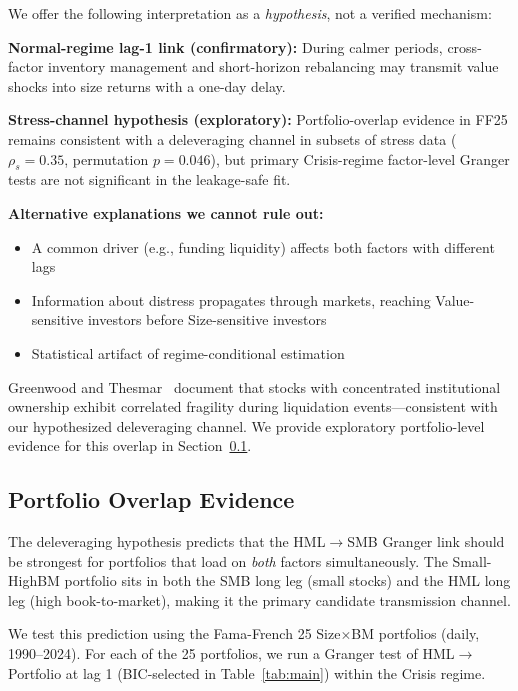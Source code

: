 \documentclass{uai2026}
\begin{document}
We offer the following interpretation as a \emph{hypothesis}, not a verified mechanism:

\textbf{Normal-regime lag-1 link (confirmatory):} During calmer periods,
cross-factor inventory management and short-horizon rebalancing may transmit
value shocks into size returns with a one-day delay.

\textbf{Stress-channel hypothesis (exploratory):} Portfolio-overlap evidence in
FF25 remains consistent with a deleveraging channel in subsets of stress data
($\rho_s = 0.35$, permutation $p = 0.046$), but primary Crisis-regime
factor-level Granger tests are not significant in the leakage-safe fit.

\textbf{Alternative explanations we cannot rule out:}
\begin{itemize}
    \item A common driver (e.g., funding liquidity) affects both factors with different lags
    \item Information about distress propagates through markets, reaching Value-sensitive
    investors before Size-sensitive investors
    \item Statistical artifact of regime-conditional estimation
\end{itemize}

Greenwood and Thesmar~\cite{greenwood2011stock} document that stocks with
concentrated institutional ownership exhibit correlated fragility during
liquidation events---consistent with our hypothesized deleveraging channel.
We provide exploratory portfolio-level evidence for this overlap in
Section~\ref{sec:overlap_evidence}.

\subsection{Portfolio Overlap Evidence}
\label{sec:overlap_evidence}

The deleveraging hypothesis predicts that the HML$\to$SMB Granger link should
be strongest for portfolios that load on \emph{both} factors simultaneously.
The Small-HighBM portfolio sits in both the SMB long leg (small stocks) and
the HML long leg (high book-to-market), making it the primary candidate
transmission channel.

We test this prediction using the Fama-French 25 Size$\times$BM portfolios
(daily, 1990--2024). For each of the 25 portfolios, we run a Granger test
of HML$\to$Portfolio at lag 1 (BIC-selected in Table~\ref{tab:main}) within
the Crisis regime.
\end{document}

